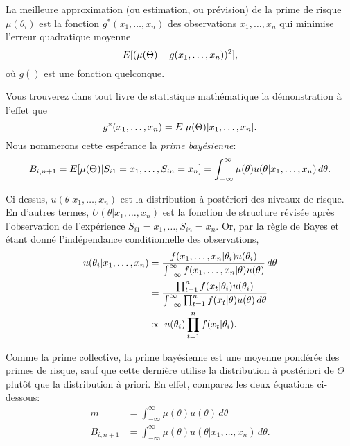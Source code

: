 La meilleure approximation (ou estimation, ou prévision) de la prime
de risque $\mu(\theta_i)$ est la fonction $g^*(x_1, \dots, x_n)$ des
observations $x_1, \dots, x_n$ qui minimise l'erreur quadratique
moyenne
\begin{equation*}
  E [ (\mu(\Theta) - g(x_1, \dots, x_n))^2 ],
\end{equation*}
où $g()$ est une fonction quelconque.

Vous trouverez dans tout livre de statistique mathématique la
démonstration à l'effet que
\begin{equation*}
  g^*(x_1, \dots, x_n) = E [ \mu(\Theta)|x_1, \dots, x_n ].
\end{equation*}
Nous nommerons cette espérance la \emph{prime bayésienne}:
\begin{equation}
  \label{eq:bayesienne:prime_bayesienne}
  B_{i, n + 1}
  = E [ \mu(\Theta)|S_{i1} = x_1, \dots, S_{in} = x_n ]
  = \int_{-\infty}^\infty \mu(\theta)
  u(\theta|x_1, \dots, x_n)\, d\theta.
\end{equation}


Ci-dessus, $u(\theta|x_1, \dots, x_n)$ est la distribution à
postériori des niveaux de risque. En d'autres termes,
$U(\theta|x_1, \dots, x_n)$ est la fonction de structure révisée après
l'observation de l'expérience $S_{i1} = x_1, \dots, S_{in} = x_n$. Or,
par la règle de Bayes et étant donné l'indépendance conditionnelle des
observations,
\begin{align*}
  u(\theta_i|x_1, \dots, x_n)
  &= \frac{f(x_1, \dots, x_n|\theta_i) u(\theta_i)}{%
    \int_{-\infty}^\infty
    f(x_1, \dots, x_n|\theta) u(\theta)}\, d\theta \\
  &= \frac{\prod_{t = 1}^n f(x_t|\theta_i) u(\theta_i)}{%
    \int_{-\infty}^\infty \prod_{t = 1}^n
    f(x_t|\theta) u(\theta)\, d\theta} \\
  &\propto\;
  u(\theta_i) \prod_{t = 1}^n f(x_t|\theta_i).
\end{align*}

Comme la prime collective, la prime bayésienne est une moyenne
pondérée des primes de risque, sauf que cette dernière utilise la
distribution à postériori de $\Theta$ plutôt que la distribution à
priori. En effet, comparez les deux équations ci-dessous:
\begin{align*}
  m &= \int_{-\infty}^\infty \mu(\theta) u(\theta)\, d\theta \\
  B_{i, n + 1} &= \int_{-\infty}^\infty \mu(\theta)
                 u(\theta|x_1, \dots, x_n)\, d\theta.
\end{align*}


